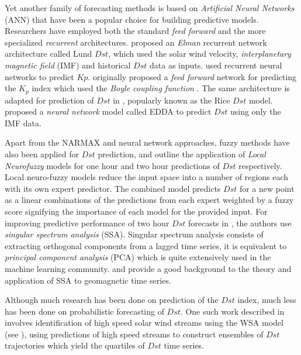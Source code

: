 Yet another family of forecasting methods is based on \emph{Artificial Neural Networks} (ANN) that have been a popular choice for building predictive models. Researchers have employed both the standard \emph{feed forward} and the more specialized \emph{recurrent} architectures. \cite{Lund} proposed an \emph{Elman} recurrent network architecture called Lund $Dst$, which used the solar wind velocity, \emph{interplanetary magnetic field} (IMF) and historical $Dst$ data as inputs. \cite{JGRA:JGRA17461} used recurrent neural networks to predict $Kp$. \cite{SWE:SWE286} originally proposed a \emph{feed forward} network for predicting the $K_p$ index which used the \emph{Boyle coupling function} \cite{boyle1997empirical}. The same architecture is adapted for prediction of $Dst$ in \cite{SWE:SWE286}, popularly known as the Rice $Dst$ model. \cite{pallocchia:hal-00318011} proposed a \emph{neural network} model called EDDA to predict $Dst$ using only the IMF data.

Apart from the NARMAX and neural network approaches, fuzzy methods have also been applied for $Dst$ prediction, \cite{SWE:SWE146} and \cite{Sharifi2006} outline the application of \emph{Local Neurofuzzy} models for one hour and two hour predictions of $Dst$ respectively. Local neuro-fuzzy models reduce the input space into a number of regions each with its own expert predictor. The combined model predicts $Dst$ for a new point as a linear combinations of the predictions from each expert weighted by a fuzzy score signifying the importance of each model for the provided input. For improving predictive performance of two hour $Dst$ forecasts in \cite{Sharifi2006}, the authors use \emph{singular spectrum analysis} (SSA). Singular spectrum analysis consists of extracting orthogonal components from a lagged time series, it is equivalent to \emph{principal component analysis} (PCA) which is quite extensively used in the machine learning community. \cite{loskutov2001testing} and \cite{loskutov2001study} provide a good background to the theory and application of SSA to geomagnetic time series.

Although much research has been done on prediction of the $Dst$ index, much less has been done on probabilistic forecasting of $Dst$. One such work described in \cite{McPherron:2013} involves identification of high speed solar wind streams using the WSA model (see \cite{WSAModel}), using predictions of high speed streams to construct ensembles of $Dst$ trajectories which yield the quartiles of $Dst$ time series. 

